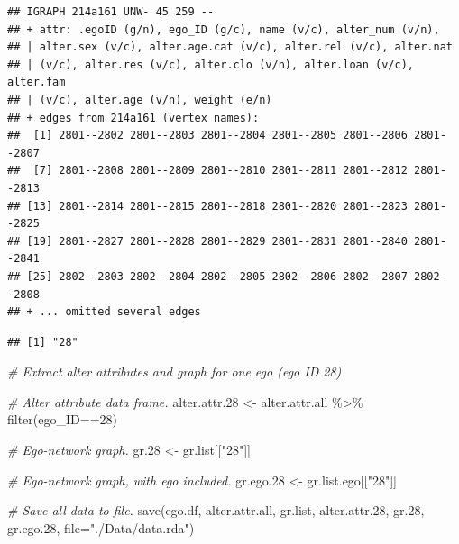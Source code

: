 \documentclass[
]{book}
\newenvironment{Shaded}{\begin{snugshade}}{\end{snugshade}}
\newcommand{\AttributeTok}[1]{\textcolor[rgb]{0.77,0.63,0.00}{#1}}
\newcommand{\CommentTok}[1]{\textcolor[rgb]{0.56,0.35,0.01}{\textit{#1}}}
\newcommand{\DecValTok}[1]{\textcolor[rgb]{0.00,0.00,0.81}{#1}}
\newcommand{\FloatTok}[1]{\textcolor[rgb]{0.00,0.00,0.81}{#1}}
\newcommand{\FunctionTok}[1]{\textcolor[rgb]{0.00,0.00,0.00}{#1}}
\newcommand{\NormalTok}[1]{#1}
\newcommand{\OtherTok}[1]{\textcolor[rgb]{0.56,0.35,0.01}{#1}}
\newcommand{\SpecialCharTok}[1]{\textcolor[rgb]{0.00,0.00,0.00}{#1}}
\newcommand{\StringTok}[1]{\textcolor[rgb]{0.31,0.60,0.02}{#1}}
\begin{document}
\begin{verbatim}
## IGRAPH 214a161 UNW- 45 259 -- 
## + attr: .egoID (g/n), ego_ID (g/c), name (v/c), alter_num (v/n),
## | alter.sex (v/c), alter.age.cat (v/c), alter.rel (v/c), alter.nat
## | (v/c), alter.res (v/c), alter.clo (v/n), alter.loan (v/c), alter.fam
## | (v/c), alter.age (v/n), weight (e/n)
## + edges from 214a161 (vertex names):
##  [1] 2801--2802 2801--2803 2801--2804 2801--2805 2801--2806 2801--2807
##  [7] 2801--2808 2801--2809 2801--2810 2801--2811 2801--2812 2801--2813
## [13] 2801--2814 2801--2815 2801--2818 2801--2820 2801--2823 2801--2825
## [19] 2801--2827 2801--2828 2801--2829 2801--2831 2801--2840 2801--2841
## [25] 2802--2803 2802--2804 2802--2805 2802--2806 2802--2807 2802--2808
## + ... omitted several edges
\end{verbatim}

\begin{Shaded}
\end{Shaded}

\begin{verbatim}
## [1] "28"
\end{verbatim}

\begin{Shaded}
\begin{Highlighting}[]
\CommentTok{\# Extract alter attributes and graph for one ego (ego ID 28)}

\CommentTok{\# Alter attribute data frame.}
\NormalTok{alter.attr}\FloatTok{.28} \OtherTok{\textless{}{-}}\NormalTok{ alter.attr.all }\SpecialCharTok{\%\textgreater{}\%}
  \FunctionTok{filter}\NormalTok{(ego\_ID}\SpecialCharTok{==}\DecValTok{28}\NormalTok{)}

\CommentTok{\# Ego{-}network graph.}
\NormalTok{gr}\FloatTok{.28} \OtherTok{\textless{}{-}}\NormalTok{ gr.list[[}\StringTok{"28"}\NormalTok{]]}

\CommentTok{\# Ego{-}network graph, with ego included.}
\NormalTok{gr.ego}\FloatTok{.28} \OtherTok{\textless{}{-}}\NormalTok{ gr.list.ego[[}\StringTok{"28"}\NormalTok{]]}

\CommentTok{\# Save all data to file.}
\FunctionTok{save}\NormalTok{(ego.df, alter.attr.all, gr.list, alter.attr}\FloatTok{.28}\NormalTok{, gr}\FloatTok{.28}\NormalTok{, gr.ego}\FloatTok{.28}\NormalTok{, }\AttributeTok{file=}\StringTok{"./Data/data.rda"}\NormalTok{)}
\end{Highlighting}
\end{Shaded}
\end{document}
